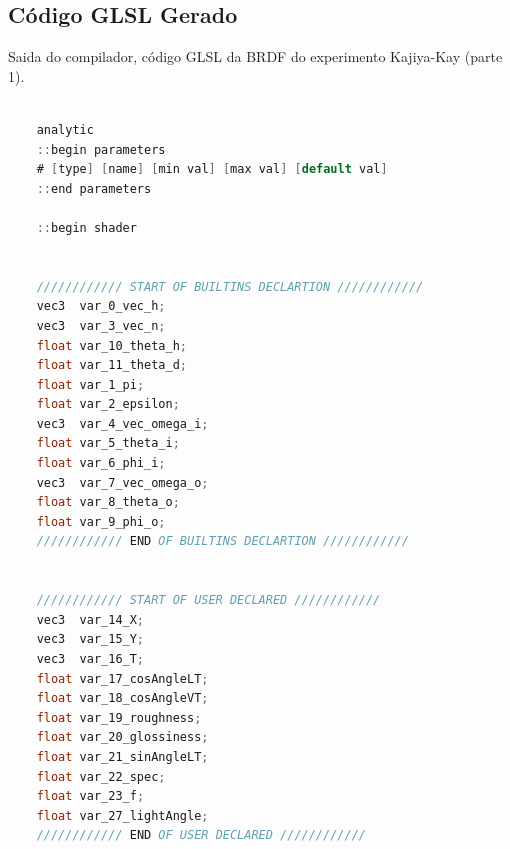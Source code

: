 \subsection{Código GLSL Gerado}

\begin{codigo}[H]
    \caption{\small Saida do compilador, código GLSL da BRDF do experimento Kajiya-Kay (parte 1). }
    \label{cod-kajiya-eqlang-declarations}
\begin{lstlisting}[language=C, inputencoding=utf8]
    
    analytic
    ::begin parameters
    # [type] [name] [min val] [max val] [default val]
    ::end parameters

    ::begin shader


    //////////// START OF BUILTINS DECLARTION ////////////
    vec3  var_0_vec_h;
    vec3  var_3_vec_n;
    float var_10_theta_h;
    float var_11_theta_d;
    float var_1_pi;
    float var_2_epsilon;
    vec3  var_4_vec_omega_i;
    float var_5_theta_i;
    float var_6_phi_i;
    vec3  var_7_vec_omega_o;
    float var_8_theta_o;
    float var_9_phi_o;
    //////////// END OF BUILTINS DECLARTION ////////////


    //////////// START OF USER DECLARED ////////////
    vec3  var_14_X;
    vec3  var_15_Y;
    vec3  var_16_T;
    float var_17_cosAngleLT;
    float var_18_cosAngleVT;
    float var_19_roughness;
    float var_20_glossiness;
    float var_21_sinAngleLT;
    float var_22_spec;
    float var_23_f;
    float var_27_lightAngle;
    //////////// END OF USER DECLARED ////////////

\end{lstlisting}
\end{codigo}

